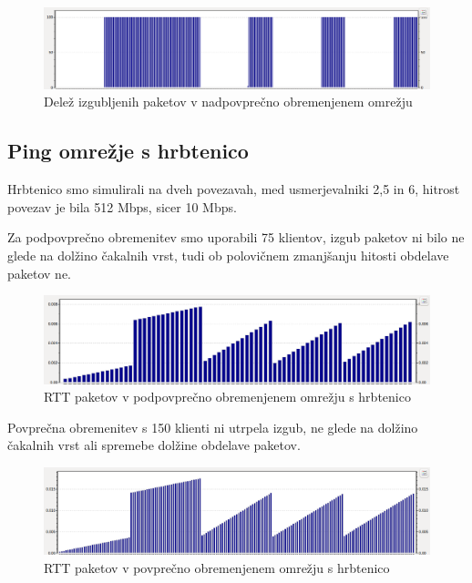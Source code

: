 \documentclass[11pt, a4paper, slovene]{book}
\begin{document}
\begin{figure}[h]
	\centering
	\includegraphics[width=\textwidth]{hPL1.png}
	\caption{Delež izgubljenih paketov v nadpovprečno obremenjenem omrežju}
	\label{hPL1}	
\end{figure}
\pagebreak

\subsection{Ping omrežje s hrbtenico} 

Hrbtenico smo simulirali na dveh povezavah, med usmerjevalniki 2,5 in 6, hitrost povezav je bila 512 Mbps, sicer 10 Mbps. 

Za podpovprečno obremenitev smo uporabili 75 klientov, izgub paketov ni bilo ne glede na dolžino čakalnih vrst, tudi ob polovičnem zmanjšanju hitosti obdelave paketov ne. 

\begin{figure}[h]
	\centering
	\includegraphics[width=\textwidth]{lRtt2.png}
	\caption{RTT paketov v podpovprečno obremenjenem omrežju s hrbtenico}
	\label{RTT4}	
\end{figure}

Povprečna obremenitev s 150 klienti ni utrpela izgub, ne glede na dolžino čakalnih vrst ali spremebe dolžine obdelave paketov.
\begin{figure}[h]
	\centering
	\includegraphics[width=\textwidth]{aRtt2.png}
	\caption{RTT paketov v povprečno obremenjenem omrežju s hrbtenico}
	\label{RTT5}	
\end{figure}
\end{document}
